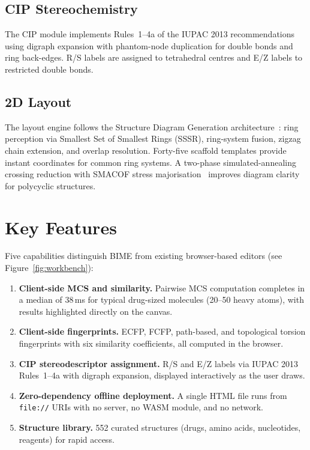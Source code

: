 \documentclass[twocolumn]{article}
\begin{document}
\subsection{CIP Stereochemistry}

The CIP module implements Rules~1--4a of the IUPAC 2013
recommendations~\cite{Favre2013} using digraph expansion with
phantom-node duplication for double bonds and ring back-edges.
R/S labels are assigned to tetrahedral centres and E/Z labels to
restricted double bonds.

\subsection{2D Layout}

The layout engine follows the Structure Diagram Generation
architecture~\cite{Helson1999}: ring perception via Smallest Set
of Smallest Rings (SSSR), ring-system fusion, zigzag chain
extension, and overlap resolution.  Forty-five scaffold templates
provide instant coordinates for common ring systems.  A two-phase
simulated-annealing crossing reduction with SMACOF stress
majorisation~\cite{deLeeuw1977} improves diagram clarity for
polycyclic structures.

\section{Key Features}

Five capabilities distinguish BIME from existing browser-based
editors (see Figure~\ref{fig:workbench}):

\begin{enumerate}[nosep]
\item \textbf{Client-side MCS and similarity.}  Pairwise MCS
  computation completes in a median of 38\,ms for typical drug-sized
  molecules (20--50 heavy atoms), with results highlighted
  directly on the canvas.
\item \textbf{Client-side fingerprints.}  ECFP, FCFP, path-based,
  and topological torsion fingerprints with six similarity coefficients,
  all computed in the browser.
\item \textbf{CIP stereodescriptor assignment.}  R/S and E/Z labels
  via IUPAC 2013 Rules~1--4a with digraph expansion, displayed
  interactively as the user draws.
\item \textbf{Zero-dependency offline deployment.}  A single HTML
  file runs from \texttt{file://} URIs with no server, no WASM
  module, and no network.
\item \textbf{Structure library.}  552 curated structures (drugs,
  amino acids, nucleotides, reagents) for rapid access.
\end{enumerate}
\end{document}

